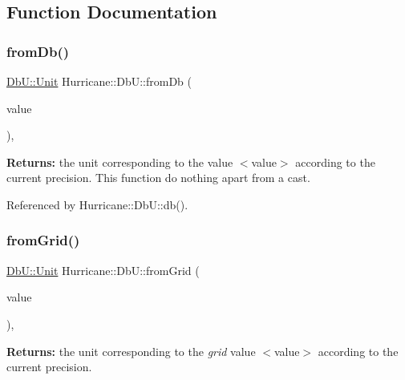 \subsection{Function Documentation}
\mbox{\label{group__DbUGroup_gaec69d65ec1651c2feea24c5931f4580b}} 
\subsubsection{\texorpdfstring{from\+Db()}{fromDb()}}
{\footnotesize\ttfamily \mbox{\hyperlink{group__DbUGroup_ga4fbfa3e8c89347af76c9628ea06c4146}{Db\+U\+::\+Unit}} Hurricane\+::\+Db\+U\+::from\+Db (\begin{DoxyParamCaption}\item[{\mbox{\hyperlink{group__DbUGroup_ga4fbfa3e8c89347af76c9628ea06c4146}{Db\+U\+::\+Unit}}}]{value }\end{DoxyParamCaption})\hspace{0.3cm}{\ttfamily [inline]}, {\ttfamily [static]}}

{\bfseries Returns\+:} the unit corresponding to the value {\ttfamily $<$value$>$} according to the current precision. This function do nothing apart from a cast. 

Referenced by Hurricane\+::\+Db\+U\+::db().

\mbox{\label{group__DbUGroup_ga367e1d1b5ac1df076745550cba8a83c1}} 
\subsubsection{\texorpdfstring{from\+Grid()}{fromGrid()}}
{\footnotesize\ttfamily \mbox{\hyperlink{group__DbUGroup_ga4fbfa3e8c89347af76c9628ea06c4146}{Db\+U\+::\+Unit}} Hurricane\+::\+Db\+U\+::from\+Grid (\begin{DoxyParamCaption}\item[{double}]{value }\end{DoxyParamCaption})\hspace{0.3cm}{\ttfamily [inline]}, {\ttfamily [static]}}

{\bfseries Returns\+:} the unit corresponding to the {\itshape grid} value {\ttfamily $<$value$>$} according to the current precision. 

